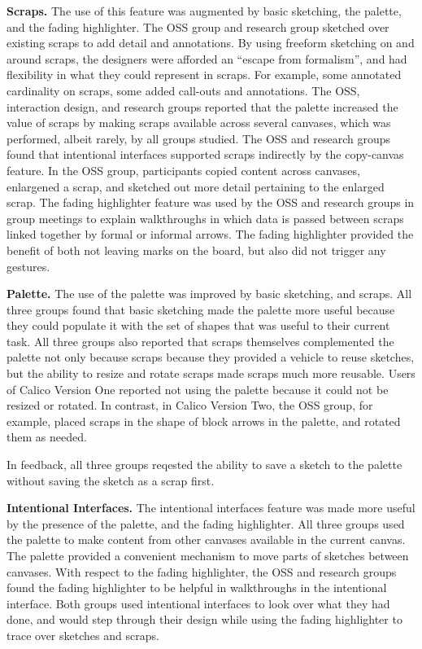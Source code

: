 \textbf{Scraps.} The use of this feature was augmented by basic sketching, the palette, and the fading highlighter. The OSS group and research group sketched over existing scraps to add detail and annotations. By using freeform sketching on and around scraps, the designers were afforded an ``escape from formalism'', and had flexibility in what they could represent in scraps. For example, some annotated cardinality on scraps, some added call-outs and annotations. The OSS, interaction design, and research groups reported that the palette increased the value of scraps by making scraps available across several canvases, which was performed, albeit rarely, by all groups studied. The OSS and research groups found that intentional interfaces supported scraps indirectly by the copy-canvas feature. In the OSS group, participants copied content across canvases, enlargened a scrap, and sketched out more detail pertaining to the enlarged scrap. The fading highlighter feature was used by the OSS and research groups in group meetings to explain walkthroughs in which data is passed between scraps linked together by formal or informal arrows. The fading highlighter provided the benefit of both not leaving marks on the board, but also did not trigger any gestures.

\textbf{Palette.} The use of the palette was improved by basic sketching, and scraps. All three groups found that basic sketching made the palette more useful because they could populate it with the set of shapes that was useful to their current task. All three groups also reported that scraps themselves complemented the palette not only because scraps because they provided a vehicle to reuse sketches, but the ability to resize and rotate scraps made scraps much more reusable. Users of Calico Version One reported not using the palette because it could not be resized or rotated. In contrast, in Calico Version Two, the OSS group, for example, placed scraps in the shape of block arrows in the palette, and rotated them as needed. 

In feedback, all three groups reqested the ability to save a sketch to the palette without saving the sketch as a scrap first.

\textbf{Intentional Interfaces.} The intentional interfaces feature was made more useful by the presence of the palette, and the fading highlighter. All three groups used the palette to make content from other canvases available in the current canvas. The palette provided a convenient mechanism to move parts of sketches between canvases. With respect to the fading highlighter, the OSS and research groups found the fading highlighter to be helpful in walkthroughs in the intentional interface. Both groups used intentional interfaces to look over what they had done, and would step through their design while using the fading highlighter to trace over sketches and scraps.

